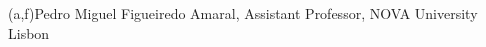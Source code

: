 %
%
%
%
(a,f){Pedro Miguel Figueiredo Amaral, Assistant Professor, NOVA University Lisbon}



%
%
%
%
